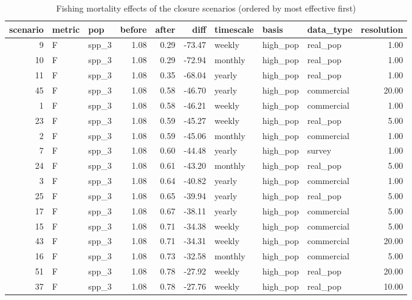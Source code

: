 \begin{longtable}{rllrrrlllr}
\caption{Fishing mortality effects of the
     closure scenarios (ordered by most effective first)} \\ 
  \hline
scenario & metric & pop & before & after & diff & timescale & basis & data\_type & resolution \\ 
  \hline
  9 & F & spp\_3 & 1.08 & 0.29 & -73.47 & weekly & high\_pop & real\_pop & 1.00 \\ 
   10 & F & spp\_3 & 1.08 & 0.29 & -72.94 & monthly & high\_pop & real\_pop & 1.00 \\ 
   11 & F & spp\_3 & 1.08 & 0.35 & -68.04 & yearly & high\_pop & real\_pop & 1.00 \\ 
   45 & F & spp\_3 & 1.08 & 0.58 & -46.70 & yearly & high\_pop & commercial & 20.00 \\ 
    1 & F & spp\_3 & 1.08 & 0.58 & -46.21 & weekly & high\_pop & commercial & 1.00 \\ 
   23 & F & spp\_3 & 1.08 & 0.59 & -45.27 & weekly & high\_pop & real\_pop & 5.00 \\ 
    2 & F & spp\_3 & 1.08 & 0.59 & -45.06 & monthly & high\_pop & commercial & 1.00 \\ 
    7 & F & spp\_3 & 1.08 & 0.60 & -44.48 & yearly & high\_pop & survey & 1.00 \\ 
   24 & F & spp\_3 & 1.08 & 0.61 & -43.20 & monthly & high\_pop & real\_pop & 5.00 \\ 
    3 & F & spp\_3 & 1.08 & 0.64 & -40.82 & yearly & high\_pop & commercial & 1.00 \\ 
   25 & F & spp\_3 & 1.08 & 0.65 & -39.94 & yearly & high\_pop & real\_pop & 5.00 \\ 
   17 & F & spp\_3 & 1.08 & 0.67 & -38.11 & yearly & high\_pop & commercial & 5.00 \\ 
   15 & F & spp\_3 & 1.08 & 0.71 & -34.38 & weekly & high\_pop & commercial & 5.00 \\ 
   43 & F & spp\_3 & 1.08 & 0.71 & -34.31 & weekly & high\_pop & commercial & 20.00 \\ 
   16 & F & spp\_3 & 1.08 & 0.73 & -32.58 & monthly & high\_pop & commercial & 5.00 \\ 
   51 & F & spp\_3 & 1.08 & 0.78 & -27.92 & weekly & high\_pop & real\_pop & 20.00 \\ 
   37 & F & spp\_3 & 1.08 & 0.78 & -27.76 & weekly & high\_pop & real\_pop & 10.00 \\ 

\end{longtable}
